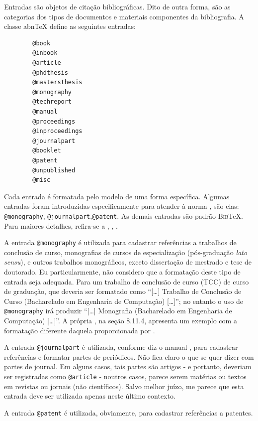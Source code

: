 \begin{apendicesenv}
    Entradas são objetos de citação bibliográficas.
    Dito de outra forma, são as categorias dos tipos de documentos e materiais componentes da bibliografia.
    A classe abn\TeX{} define as seguintes entradas:

    \begin{verbatim}
        @book
        @inbook
        @article
        @phdthesis
        @mastersthesis
        @monography
        @techreport
        @manual
        @proceedings
        @inproceedings
        @journalpart
        @booklet
        @patent
        @unpublished
        @misc
    \end{verbatim}

    Cada entrada é formatada pelo modelo de uma forma específica.
    Algumas entradas foram introduzidas especificamente para atender à norma , são elas: \verb|@monography|, \verb|@journalpart|,\verb|@patent|.
    As demais entradas são padrão \textsc{Bib}\TeX{}.
    Para maiores detalhes, refira-se a , , .

    A entrada \verb|@monography| é utilizada para cadastrar referências a trabalhos de conclusão de curso, monografias de cursos de especialização (pós-graduação \textit{lato sensu}), e outros trabalhos monográficos, exceto dissertação de mestrado e tese de doutorado.
    Eu particularmente, não considero que a formatação deste tipo de entrada seja adequada.
    Para um trabalho de conclusão de curso (TCC) de curso de graduação, que deveria ser formatado como ``[\ldots] Trabalho de Conclusão de Curso (Bacharelado em Engenharia de Computação) [\ldots]''; no entanto o uso de \verb|@monography| irá produzir ``[\ldots] Monografia (Bacharelado em Engenharia de Computação) [\ldots]''.
    A própria  , na seção 8.11.4, apresenta um exemplo com a formatação diferente daquela proporcionada por .

    A entrada \verb|@journalpart| é utilizada, conforme diz o manual \cite{abnTeX22014d}, para cadastrar referências e formatar partes de periódicos.
    Não fica claro o que se quer dizer com partes de journal.
    Em alguns casos, tais partes são artigos - e portanto, deveriam ser registradas como \verb|@article| - noutros casos, parece serem matérias ou textos em revistas ou jornais (não científicos).
    Salvo melhor juízo, me parece que esta entrada deve ser utilizada apenas neste último contexto.

    A entrada \verb|@patent| é utilizada, obviamente, para cadastrar referências a patentes.


\end{apendicesenv}
